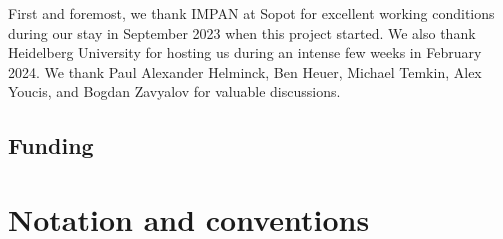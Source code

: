 \documentclass[a4paper,twoside,11pt,reqno]{amsart}
\DeclareRobustCommand{\SkipTocEntry}[5]{}
\theoremstyle{definition}
\numberwithin{equation}{subsection}
\begin{document}
First and foremost, we thank IMPAN at Sopot for excellent working conditions during our stay in September 2023 when this project started. We also thank Heidelberg University for hosting us during an intense few weeks in February 2024. We thank Paul Alexander Helminck, Ben Heuer, Michael Temkin, Alex Youcis, and Bogdan Zavyalov for valuable discussions.


\subsection*{Funding}

\grants 


\section*{Notation and conventions}
\end{document}
